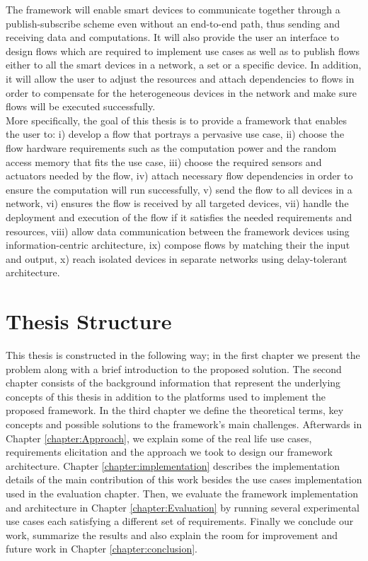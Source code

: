 	\noindent The framework will enable smart devices to communicate together through a publish-subscribe scheme even without an end-to-end path, thus sending and receiving data and computations.  It will also provide the user  an interface to design flows which are required to implement use cases as well as to publish flows either to all the smart devices in a network, a set or a specific device. In addition, it will allow the user to adjust the resources and attach dependencies to flows in order to compensate for the heterogeneous devices in the network and make sure flows will be executed successfully.\\

\noindent More specifically, the goal of this thesis is to provide a framework that enables the user to: i) develop a flow that portrays a pervasive use case, ii) choose the flow hardware requirements such as the computation power and the random access memory that fits the use case, iii) choose the required sensors and actuators needed by the flow, iv) attach necessary flow dependencies   in order to ensure the computation will run successfully, v) send the flow to all devices in a network, vi) ensures the flow is received by all targeted devices, vii) handle the deployment and execution of the flow if it satisfies the needed requirements and resources, viii) allow data communication between the framework devices using information-centric architecture, ix) compose flows by matching their the input and output, x) reach isolated devices in separate networks using delay-tolerant architecture. \\



 

\section{Thesis Structure}

This thesis is constructed in the following way; in the first chapter we present the problem along with a brief introduction to the proposed solution. The second chapter consists of the background information  that represent the underlying  concepts of this thesis in addition to the platforms used to implement the proposed framework. In the third chapter we define the theoretical terms, key concepts and possible solutions to the framework's main challenges. Afterwards in Chapter \ref{chapter:Approach}, we explain some of the real life use cases, requirements elicitation and the approach we took to design our framework architecture. Chapter \ref{chapter:implementation} describes the implementation details of the main contribution of this work besides the use cases implementation used in the evaluation chapter. Then, we evaluate the framework implementation and  architecture in Chapter \ref{chapter:Evaluation} by running several experimental use cases each satisfying a different set of requirements. Finally we conclude our work, summarize the results and also explain the room for improvement and future work in Chapter \ref{chapter:conclusion}.